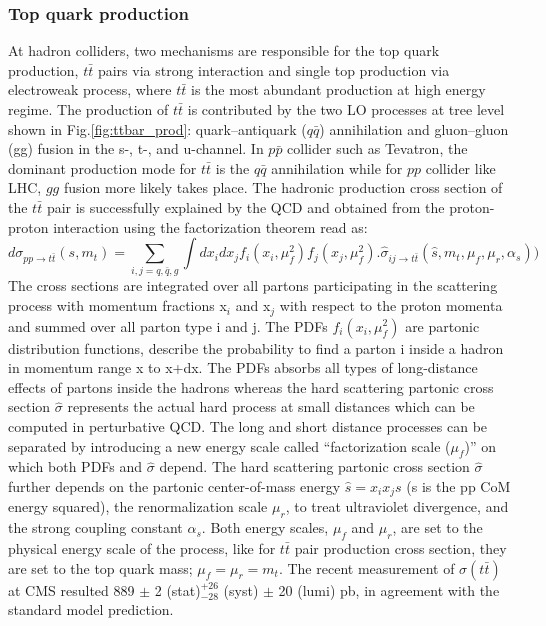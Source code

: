 \subsubsection*{Top quark production}
At hadron colliders, two mechanisms are responsible for the top quark production, $t\bar{t}$ pairs via strong interaction and single top production via electroweak process, where $t\bar{t}$  is the most abundant production at high energy regime. The production of $t\bar{t}$ is contributed by the two LO processes at tree level shown in Fig.\ref{fig:ttbar_prod}: quark–antiquark ($q\bar{q}$) annihilation and gluon–gluon (gg) fusion in the s-, t-, and u-channel. In $p\bar{p}$ collider such as Tevatron, the dominant production mode for $t\bar{t}$ is the $q\bar{q}$ annihilation while for $pp$ collider like LHC, $gg$ fusion more likely takes place. The hadronic production cross section of the $t\bar{t}$ pair is successfully explained by the QCD and obtained from the proton-proton interaction using the factorization theorem \cite{ttbar_production} read as:
\begin{equation}
d\sigma_{pp\rightarrow t\bar{t}}(s,m_{t}) = \sum\limits_{i,j=q,\bar{q},g}\int dx_{i}dx_{j}f_{i}(x_{i},\mu^{2}_{f})f_{j}(x_{j},\mu^{2}_{f}).\hat{\sigma}_{ij\rightarrow t\bar{t}}(\hat{s}, m_{t}, \mu_{f},\mu_{r}, \alpha_{s}))
\end{equation}
The cross sections are integrated over all partons participating in the scattering process with momentum fractions x$_i$ and x$_j$ with respect to the proton momenta and summed over all parton type i and j. The PDFs $f_{i}(x_{i}, \mu^{2}_{f})$ are partonic distribution functions, describe the probability to find a parton i inside a hadron in momentum range x to x+dx. The PDFs absorbs all types of long-distance effects of partons inside the hadrons whereas the hard scattering partonic cross section $\hat{\sigma}$ represents the actual hard process at small distances which can be computed in perturbative QCD. The long and short distance processes can be separated by introducing a new energy scale called “factorization scale ($\mu_{f}$)” on which both PDFs and $\hat{\sigma}$ depend. The hard scattering partonic cross section $\hat{\sigma}$ further depends on the partonic center-of-mass energy $\hat{s} = x_{i}x_{j}s$ (s is the pp CoM energy squared), the renormalization scale $\mu_{r}$, to treat ultraviolet divergence, and the strong coupling constant $\alpha_{s}$. Both energy scales, $\mu_{f}$ and $\mu_{r}$, are set to the physical energy scale of the process, like for $t\bar{t}$ pair production cross section, they are set to the top quark mass; $\mu_{f} = \mu_{r} = m_{t}$. The recent measurement of $\sigma(t\bar{t})$ at CMS resulted 889 $\pm$ 2 (stat)$^{+26}_{-28}$ (syst) $\pm$ 20 (lumi) pb,  in agreement with the standard model prediction\cite{top:16_006}.\\
